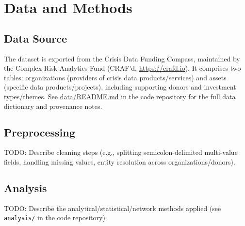 \section{Data and Methods}
\label{sec:methods}

\subsection{Data Source}
The dataset is exported from the Crisis Data Funding Compass, maintained by the Complex
Risk Analytics Fund (CRAF'd, \url{https://crafd.io}). It comprises two tables: organizations
(providers of crisis data products/services) and assets (specific data products/projects),
including supporting donors and investment types/themes. See
\href{https://github.com/}{data/README.md} in the code repository for the full data
dictionary and provenance notes.

\subsection{Preprocessing}
TODO: Describe cleaning steps (e.g., splitting semicolon-delimited multi-value fields,
handling missing values, entity resolution across organizations/donors).

\subsection{Analysis}
TODO: Describe the analytical/statistical/network methods applied (see
\texttt{analysis/} in the code repository).
